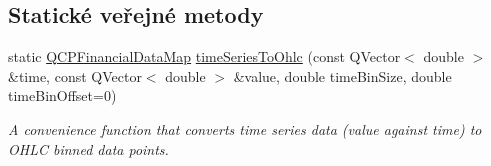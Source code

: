 \subsection*{Statické veřejné metody}
\begin{DoxyCompactItemize}
\item 
static \hyperlink{qcustomplot_8h_a745c09823fae0974b50beca9bc3b3d7d}{Q\+C\+P\+Financial\+Data\+Map} \hyperlink{classQCPFinancial_a0c3453d1c03e320950fdd2df54e3ebc8}{time\+Series\+To\+Ohlc} (const Q\+Vector$<$ double $>$ \&time, const Q\+Vector$<$ double $>$ \&value, double time\+Bin\+Size, double time\+Bin\+Offset=0)
\begin{DoxyCompactList}\small\item\em A convenience function that converts time series data ({\itshape value} against {\itshape time}) to O\+H\+L\+C binned data points. \end{DoxyCompactList}\end{DoxyCompactItemize}
